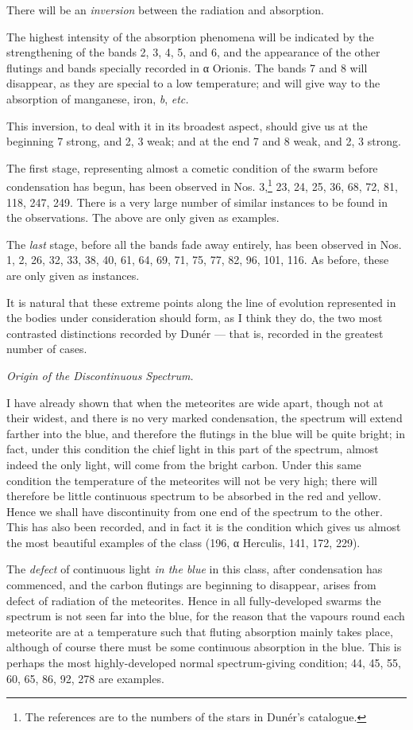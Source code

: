 \documentclass[a4paper, 12pt, oneside, polutonikogreek, english]{article}
\begin{document}
There will be an \emph{inversion} between the radiation and absorption.

The highest intensity of the absorption phenomena will be indicated by the strengthening of the bands 2, 3, 4, 5, and 6, and the appearance of the other flutings and bands specially recorded in α Orionis. The bands 7 and 8 will disappear, as they are special to a low temperature; and will give way to the absorption of manganese, iron, \emph{b}, \emph{etc.}

This inversion, to deal with it in its broadest aspect, should give us at the beginning 7 strong, and 2, 3 weak; and at the end 7 and 8 weak, and 2, 3 strong.

The first stage, representing almost a cometic condition of the swarm before condensation has begun, has been observed in Nos. 3,\footnote{The references are to the numbers of the stars in Dunér's catalogue.} 23, 24, 25, 36, 68, 72, 81, 118, 247, 249. There is a very large number of similar instances to be found in the observations. The above are only given as examples.

The \emph{last} stage, before all the bands fade away entirely, has been observed in Nos. 1, 2, 26, 32, 33, 38, 40, 61, 64, 69, 71, 75, 77, 82, 96, 101, 116. As before, these are only given as instances.

It is natural that these extreme points along the line of evolution represented in the bodies under consideration should form, as I think they do, the two most contrasted distinctions recorded by Dunér --- that is, recorded in the greatest number of cases.

\emph{Origin of the Discontinuous Spectrum.}

I have already shown that when the meteorites are wide apart, though not at their widest, and there is no very marked condensation, the spectrum will extend farther into the blue, and therefore the flutings in the blue will be quite bright; in fact, under this condition the chief light in this part of the spectrum, almost indeed the only light, will come from the bright carbon. Under this same condition the temperature of the meteorites will not be very high; there will therefore be little continuous spectrum to be absorbed in the red and yellow. Hence we shall have discontinuity from one end of the spectrum to the other. This has also been recorded, and in fact it is the condition which gives us almost the most beautiful examples of the class (196, α Herculis, 141, 172, 229).

The \emph{defect} of continuous light \emph{in the blue} in this class, after condensation has commenced, and the carbon flutings are beginning to disappear, arises from defect of radiation of the meteorites. Hence in all fully-developed swarms the spectrum is not seen far into the blue, for the reason that the vapours round each meteorite are at a temperature such that fluting absorption mainly takes place, although of course there must be some continuous absorption in the blue. This is perhaps the most highly-developed normal spectrum-giving condition; 44, 45, 55, 60, 65, 86, 92, 278 are examples.
\end{document}
